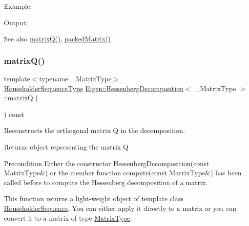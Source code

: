 Example\+: 
\begin{DoxyCodeInclude}{0}
\end{DoxyCodeInclude}
 Output\+: 
\begin{DoxyVerbInclude}
\end{DoxyVerbInclude}


\begin{DoxySeeAlso}{See also}
\mbox{\hyperlink{class_eigen_1_1_hessenberg_decomposition_a346441e4902a58d43d698ac3da6ff791}{matrix\+Q()}}, \mbox{\hyperlink{class_eigen_1_1_hessenberg_decomposition_a1f72b7612fd4edc5a6f31005e433e1dd}{packed\+Matrix()}} 
\end{DoxySeeAlso}
\mbox{\label{class_eigen_1_1_hessenberg_decomposition_a346441e4902a58d43d698ac3da6ff791}} 
\subsubsection{\texorpdfstring{matrixQ()}{matrixQ()}}
{\footnotesize\ttfamily template$<$typename \+\_\+\+Matrix\+Type$>$ \\
\mbox{\hyperlink{class_eigen_1_1_hessenberg_decomposition_a7c1188cd5d8f550c8941df75a50a7d08}{Householder\+Sequence\+Type}} \mbox{\hyperlink{class_eigen_1_1_hessenberg_decomposition}{Eigen\+::\+Hessenberg\+Decomposition}}$<$ \+\_\+\+Matrix\+Type $>$\+::matrixQ (\begin{DoxyParamCaption}{ }\end{DoxyParamCaption}) const\hspace{0.3cm}{\ttfamily [inline]}}



Reconstructs the orthogonal matrix Q in the decomposition. 

\begin{DoxyReturn}{Returns}
object representing the matrix Q
\end{DoxyReturn}
\begin{DoxyPrecond}{Precondition}
Either the constructor Hessenberg\+Decomposition(const Matrix\+Type\&) or the member function compute(const Matrix\+Type\&) has been called before to compute the Hessenberg decomposition of a matrix.
\end{DoxyPrecond}
This function returns a light-\/weight object of template class \mbox{\hyperlink{class_eigen_1_1_householder_sequence}{Householder\+Sequence}}. You can either apply it directly to a matrix or you can convert it to a matrix of type \mbox{\hyperlink{class_eigen_1_1_hessenberg_decomposition_a93a611350a7db9d1da18f2c828ecea9f}{Matrix\+Type}}.

